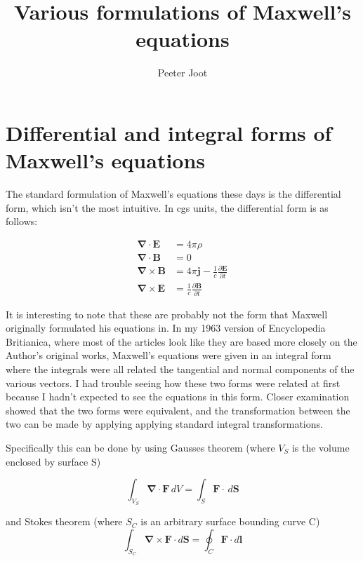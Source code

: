 \documentclass{article}      %
\title{Various formulations of Maxwell's equations} %
\author{Peeter Joot}         %
\newcommand{\grad}[0]{\boldsymbol{\nabla}}
\newcommand{\curl}[0]{\grad \times}
\newcommand{\diverg}[0]{\grad \cdot}
\newcommand{\D}[2] {\frac {\partial #2} {\partial #1}}
\newcommand{\Bj}[0]{\mathbf{j}}
\newcommand{\BB}[0]{\mathbf{B}}
\newcommand{\BE}[0]{\mathbf{E}}
\newcommand{\BF}[0]{\mathbf{F}}
\newcommand{\BS}[0]{\mathbf{S}}
\begin{document}


\section{Differential and integral forms of Maxwell's equations}

The standard formulation of Maxwell's equations these days is the differential
form, which isn't the most intuitive.  In cgs units, the differential
form is as follows:

\begin{align*}
\diverg \BE &= 4\pi\rho \\
\diverg \BB &= 0 \\
\curl \BB &= 4\pi \Bj - \frac{1}{c} \D{t}{\BE} \\
\curl \BE &= \frac{1}{c} \D{t}{\BB}
\end{align*}

It is interesting to note that these are probably not the form that Maxwell 
originally formulated his equations in.  In my 1963 version of Encyclopedia 
Britianica, where most of the articles look like they are based more closely on the Author's
original works, Maxwell's equations were given in an integral form where the 
integrals were all related the tangential and normal components of the various vectors.  I had 
trouble seeing how these two forms were related at first because I hadn't expected to 
see the equations in this form.  Closer examination showed that the two forms 
were equivalent, and the transformation between the two can be made by applying 
applying standard integral transformations.

Specifically this can be done by using Gausses theorem (where $V_S$ is the volume enclosed by surface S)

\begin{equation*}
\int_{V_S} \diverg \BF\,dV =
\int_S \mathbf{F} \cdot\, d\BS 
\end{equation*}

and Stokes theorem (where $S_C$ is an arbitrary surface bounding curve C)
\begin{equation*}
\int_{S_C} \curl \BF \cdot d\BS = \oint_C \mathbf{F} \cdot d\mathbf{l}
\end{equation*}
\end{document}

